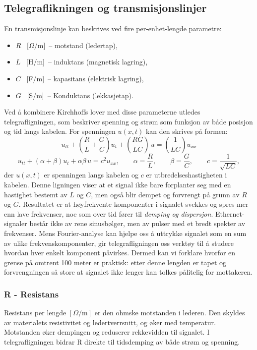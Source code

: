 \subsection{Telegraflikningen og transmisjonslinjer}
En transmisjonslinje kan beskrives ved fire per-enhet-lengde parametre:
\begin{itemize}
    \item $R$ \, [$\Omega$/m] \,-- motstand (ledertap),
    \item $L$ \, [H/m] \,-- induktans (magnetisk lagring),
    \item $C$ \, [F/m] \,-- kapasitans (elektrisk lagring),
    \item $G$ \, [S/m] \,-- Konduktans (lekkasjetap).
\end{itemize}
Ved å kombinere Kirchhoffs lover med disse parameterne utledes telegrafligningen, som beskriver spenning og strøm som funksjon av både posisjon og tid langs kabelen. For spenningen $u(x,t)$ kan den skrives på formen:
\begin{equation}
    u_{tt} + \left(\frac{R}{L} + \frac{G}{C}\right)u_t + \left(\frac{RG}{LC}\right)\,u = \left(\frac{1}{LC}\right) u_{xx}
\end{equation}
\[
    u_{tt} + \left(\alpha + \beta\right)u_t + \alpha\beta\,u = c^2 u_{xx}, \qquad \alpha=\frac{R}{L}, \qquad \beta=\frac{G}{C}, \qquad c = \frac{1}{\sqrt{LC}} ,
\]
der $u(x,t)$ er spenningen langs kabelen og $c$ er utbredelseshastigheten i kabelen.  
Denne ligningen viser at et signal ikke bare forplanter seg med en hastighet bestemt av $L$ og $C$, men også blir dempet og forvrengt på grunn av $R$ og $G$. Resultatet er at høyfrekvente komponenter i signalet svekkes og spres mer enn lave frekvenser, noe som over tid fører til \emph{demping og dispersjon}.  
Ethernet-signaler består ikke av rene sinusbølger, men av pulser med et bredt spekter av frekvenser. Mens Fourier-analyse kan hjelpe oss  å uttrykke signalet som en sum av ulike frekvenskomponenter, gir telegrafligningen oss verktøy til å studere hvordan hver enkelt komponent påvirkes. Dermed kan vi forklare hvorfor en grense på omtrent 100 meter er praktisk: etter denne lengden er tapet og forvrengningen så store at signalet ikke lenger kan tolkes pålitelig for mottakeren.


\subsubsection{R - Resistans}
Resistans per lengde $[\Omega/\mathrm{m}]$ er den ohmske motstanden i lederen. Den skyldes av materialets resistivitet og ledertverrsnitt, og øker med temperatur. Motstanden øker dempingen og reduserer rekkevidden til signalet. I telegrafligningen bidrar R direkte til tidsdemping av både strøm og spenning.

